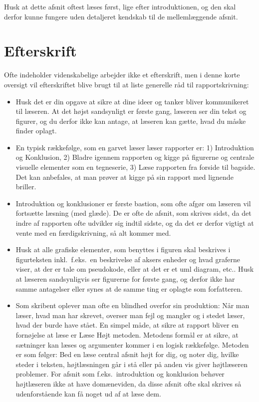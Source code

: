 \documentclass[a4paper]{article}
\begin{document}
Husk at dette afsnit oftest læses først, lige efter introduktionen, og den skal derfor kunne fungere uden detaljeret kendskab til de mellemlæggende afsnit.

\section{Efterskrift}
Ofte indeholder videnskabelige arbejder ikke et efterskrift, men i denne korte oversigt vil efterskriftet blive brugt til at liste generelle råd til rapportskrivning:
\begin{itemize}
\item Husk det er din opgave at sikre at dine ideer og tanker bliver kommunikeret til læseren. At det højst sandsynligt er første gang, læseren ser din tekst og figurer, og du derfor ikke kan antage, at læseren kan gætte, hvad du måske finder oplagt.
\item En typisk rækkefølge, som en garvet læser læser rapporter er: 1) Introduktion og Konklusion, 2) Bladre igennem rapporten og kigge på figurerne og centrale visuelle elementer som en tegneserie, 3) Læse rapporten fra forside til bagside. Det kan anbefales, at man prøver at kigge på sin rapport med lignende briller.
\item Introduktion og konklusioner er første bastion, som ofte afgør om læseren vil fortsætte læsning (med glæde). De er ofte de afsnit, som skrives sidst, da det indre af rapporten ofte udvikler sig indtil sidste, og da det er derfor vigtigt at vente med en færdigskrivning, så alt kommer med.
\item Husk at alle grafiske elementer, som benyttes i figuren skal beskrives i figurteksten inkl.\ f.eks.\ en beskrivelse af aksers enheder og hvad graferne viser, at der er tale om pseudokode, eller at det er et uml diagram, etc.. Husk at læseren sandsynligvis ser figurerne for første gang, og derfor ikke har samme antagelser eller synes at de samme ting er oplagte som forfatteren.
\item Som skribent oplever man ofte en blindhed overfor sin produktion: Når man læser, hvad man har skrevet, overser man fejl og mangler og i stedet læser, hvad der burde have stået. En simpel måde, at sikre at rapport bliver en fornøjelse at læse er Læse Højt metoden. Metodens formål er at sikre, at sætninger kan læses og argumenter kommer i en logisk rækkefølge.  Metoden er som følger: Bed en læse central afsnit højt for dig, og noter dig, hvilke steder i teksten, højtlæsningen går i stå eller på anden vis giver højtlæseren problemer. For afsnit som f.eks.\ introduktion og konklusion behøver højtlæseren ikke at have domæneviden, da disse afsnit ofte skal skrives så udenforstående kan få noget ud af at læse dem.
\end{itemize}
\end{document}
